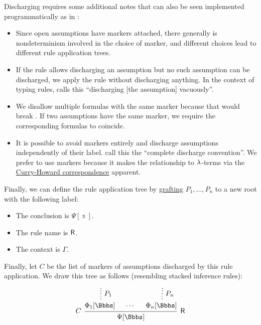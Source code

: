 \begin{definition}
\begin{thmenum}[resume=def:natural_deduction_proof_tree]
    Discharging requires some additional notes that can also be seen implemented programmatically as  in \cite{notebook:code}:
    \begin{itemize}
      \item Since open assumptions have markers attached, there generally is nondeterminism involved in the choice of marker, and different choices lead to different rule application trees.
      \item If the rule allows discharging an assumption but no such assumption can be discharged, we apply the rule without discharging anything. In the context of typing rules,  calls this \enquote{discharging [the assumption] vacuously}.
      \item We disallow multiple formulas with the same marker because that would break . If two assumptions have the same marker, we require the corresponding formulas to coincide.
      \item It is possible to avoid markers entirely and discharge assumptions independently of their label.  call this the \enquote{complete discharge convention}. We prefer to use markers because it makes the relationship to \( \mathrm{\lambda} \)-terms via the \hyperref[con:curry_howard_correspondence]{Curry-Howard correspondence} apparent.
    \end{itemize}

    Finally, we can define the rule application tree by \hyperref[def:ordered_tree_grafting_product]{grafting} \( P_1, \ldots, P_n \) to a new root with the following label:
    \begin{itemize}
      \item The conclusion is \( \Psi[\Bbbs] \).
      \item The rule name is \( \textsf{R} \).
      \item The context is \( \Gamma \).
    \end{itemize}

    Finally, let \( C \) be the list of markers of assumptions discharged by this rule application. We draw this tree as follows (resembling stacked inference rules):
    \begin{equation*}
      \begin{prooftree}
        \hypo{}
        \ellipsis { \( P_1 \) } { \Phi_1[\Bbbs] }

        \hypo{ \cdots }

        \hypo{}
        \ellipsis { \( P_n \) } { \Phi_n[\Bbbs] }
        \infer[left label=\( C \)]3[\logic{R}]{ \Psi[\Bbbs] }
      \end{prooftree}
    \end{equation*}
  \end{thmenum}
\end{definition}

